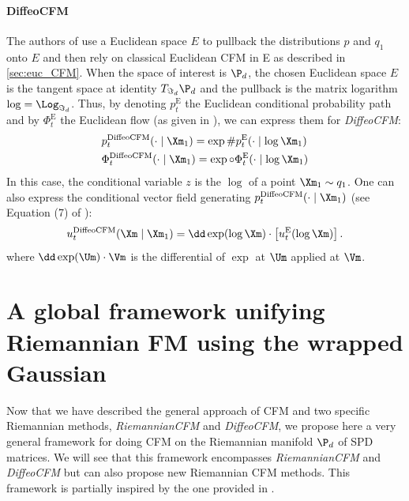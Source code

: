 \documentclass[10pt]{article} %
\theoremstyle{plain}
\theoremstyle{definition}
\theoremstyle{remark}
\begin{document}
\paragraph{DiffeoCFM}
The authors of \citet{collasRiemannianFlowMatching2025} use a Euclidean space $E$ to pullback the distributions $p$ and $q_1$ onto $E$ and then rely on classical Euclidean CFM in E as described in \cref{sec:euc_CFM}. When the space of interest is $\P_d$, the chosen Euclidean space $E$ is the tangent space at identity $T_{\Im_d} \P_d$ and the pullback is the matrix logarithm $\log = \Log_{\Im_d}$. Thus, by denoting $p^{\text{E}}_t$ the Euclidean conditional probability path and by $\Phi^{\text{E}}_t$ the Euclidean flow (as given in \citealt{lipmanFlowMatchingGenerative2023}), we can express them for \emph{DiffeoCFM}:
\begin{equation}\label{eq:diffeoCFM}
  \begin{aligned}
    &p^{\text{DiffeoCFM}}_t(\cdot \mid \Xm_1) = \exp \# p^{\text{E}}_t(\cdot \mid \log\Xm_1) \\
    &\Phi^{\text{DiffeoCFM}}_t(\cdot \mid \Xm_1) = \exp \circ \Phi^{\text{E}}_t(\cdot \mid \log \Xm_1)
  \end{aligned}
\end{equation}
In this case, the conditional variable $z$ is the $\log$ of a point $\Xm_1 \sim q_1$. One can also express the conditional vector field generating $p^{\text{DiffeoCFM}}_t(\cdot \mid \Xm_1)$ (see Equation (7) of \citealt{collasRiemannianFlowMatching2025}):
\begin{equation}\label{eq:diffeo_cfm_u_cond}
  u^{\text{DiffeoCFM}}_t(\Xm \mid \Xm_1) = \dd \exp(\log\Xm)\cdot\left[u^{\text{E}}_t(\log\Xm)\right].
\end{equation}
where $\dd \exp(\Um)\cdot \Vm$ is the differential of $\exp$ at $\Um$ applied at $\Vm$.
\section{A global framework unifying Riemannian FM using the wrapped Gaussian}
\label{sec:global_framework}
Now that we have described the general approach of CFM and two specific Riemannian methods, \emph{RiemannianCFM} and \emph{DiffeoCFM}, we propose here a very general framework for doing CFM on the Riemannian manifold $\P_d$ of SPD matrices. We will see that this framework encompasses \emph{RiemannianCFM} and \emph{DiffeoCFM} but can also propose new Riemannian CFM methods. This framework is partially inspired by the one provided in \citet{tong2024improving}.
\end{document}
